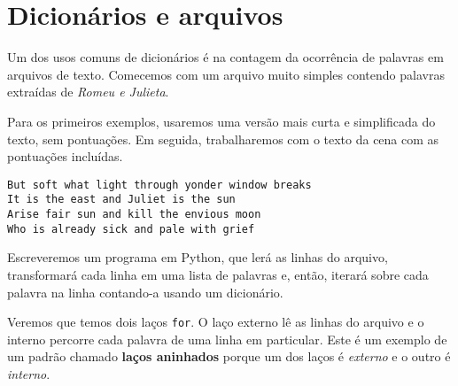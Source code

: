 \section{Dicionários e arquivos}

Um dos usos comuns de dicionários é na contagem da ocorrência de palavras em arquivos de texto.
Comecemos com um arquivo muito simples contendo palavras extraídas de \emph{Romeu e Julieta}.

Para os primeiros exemplos, usaremos uma versão mais curta e simplificada do texto, sem pontuações. Em seguida, trabalharemos com o texto da cena com as pontuações incluídas.

\beforeverb
\begin{verbatim}
But soft what light through yonder window breaks
It is the east and Juliet is the sun
Arise fair sun and kill the envious moon
Who is already sick and pale with grief
\end{verbatim}
\afterverb
%
Escreveremos um programa em Python, que lerá as linhas do arquivo, transformará cada linha em uma lista de palavras e, então, iterará sobre cada palavra na linha contando-a usando um dicionário.

Veremos que temos dois laços {\tt for}. O laço externo lê as linhas do arquivo e o interno percorre cada palavra de uma linha em particular. Este é um exemplo de um padrão chamado {\bf laços aninhados} porque um dos laços é \emph{externo} e o outro é \emph{interno}.

